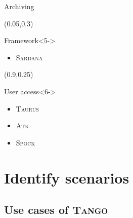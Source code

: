 \documentclass{beamer}
\newcommand{\tango}{\textsc{Tango}}
\newcommand{\sardana}{\textsc{Sardana}}
\newcommand{\atk}{\textsc{Atk}}
\newcommand{\taurus}{\textsc{Taurus}}
\newcommand{\spock}{\textsc{Spock}}
\begin{document}
\begin{frame}
\begin{textblock*}{45mm}
\begin{exampleblock}{Archiving}
\begin{itemize}
            \end{itemize}
        \end{exampleblock}
    \end{textblock*}
    \begin{textblock*}{25mm}(0.05\textwidth,0.3\textheight)
        \begin{exampleblock}{Framework}<5->
            \begin{itemize}
                \item \sardana
            \end{itemize}
        \end{exampleblock}
    \end{textblock*}
    \begin{textblock*}{25mm}(0.9\textwidth,0.25\textheight)
        \begin{exampleblock}{User access}<6->
            \begin{itemize}
                \item \taurus
                \item \atk
                \item \spock
            \end{itemize}
        \end{exampleblock}
    \end{textblock*}
\end{frame}

\section{Identify scenarios}

\subsection{Use cases of \tango}
\end{document}
